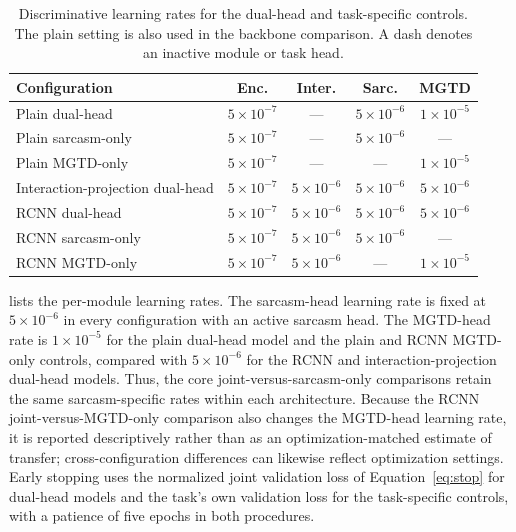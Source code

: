 \begin{table}[h]
  \centering
  \small
  \setlength{\tabcolsep}{1.5pt}
  \begin{tabular}{@{}>{\raggedright\arraybackslash}p{2.35cm}cccc@{}}
    \toprule
    \textbf{Configuration} & \textbf{Enc.} & \textbf{Inter.} & \textbf{Sarc.} & \textbf{MGTD} \\
    \midrule
    Plain dual-head & $5\times10^{-7}$ & --- & $5\times10^{-6}$ & $1\times10^{-5}$ \\
    Plain sarcasm-only & $5\times10^{-7}$ & --- & $5\times10^{-6}$ & --- \\
    Plain MGTD-only & $5\times10^{-7}$ & --- & --- & $1\times10^{-5}$ \\
    Interaction-projection dual-head & $5\times10^{-7}$ & $5\times10^{-6}$ & $5\times10^{-6}$ & $5\times10^{-6}$ \\
    RCNN dual-head & $5\times10^{-7}$ & $5\times10^{-6}$ & $5\times10^{-6}$ & $5\times10^{-6}$ \\
    RCNN sarcasm-only & $5\times10^{-7}$ & $5\times10^{-6}$ & $5\times10^{-6}$ & --- \\
    RCNN MGTD-only & $5\times10^{-7}$ & $5\times10^{-6}$ & --- & $1\times10^{-5}$ \\
    \bottomrule
  \end{tabular}
  \caption{Discriminative learning rates for the dual-head and task-specific controls. The plain setting is also used in the backbone comparison. A dash denotes an inactive module or task head.}
  \label{tab:lr}
\end{table}

 lists the per-module learning rates. The sarcasm-head learning rate is fixed at $5\times10^{-6}$ in every configuration with an active sarcasm head. The MGTD-head rate is $1\times10^{-5}$ for the plain dual-head model and the plain and RCNN MGTD-only controls, compared with $5\times10^{-6}$ for the RCNN and interaction-projection dual-head models. Thus, the core joint-versus-sarcasm-only comparisons retain the same sarcasm-specific rates within each architecture. Because the RCNN joint-versus-MGTD-only comparison also changes the MGTD-head learning rate, it is reported descriptively rather than as an optimization-matched estimate of transfer; cross-configuration differences can likewise reflect optimization settings. Early stopping uses the normalized joint validation loss of Equation~\ref{eq:stop} for dual-head models and the task's own validation loss for the task-specific controls, with a patience of five epochs in both procedures.

